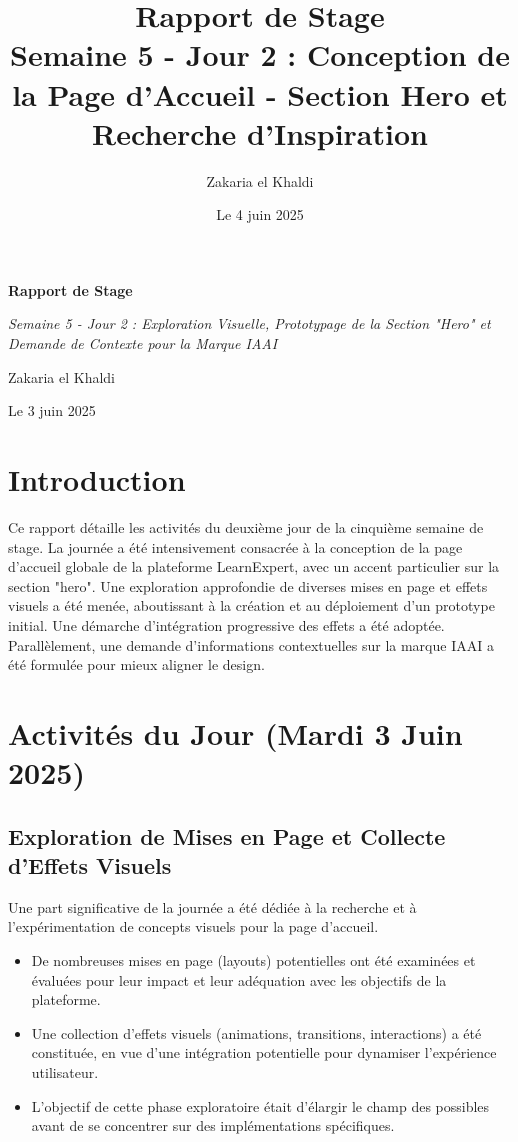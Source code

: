 \documentclass[12pt, a4paper]{article}
\title{\Huge\bfseries\color{primary} Rapport de Stage \\ 
      \Large Semaine 5 - Jour 2 : Conception de la Page d'Accueil - Section Hero et Recherche d'Inspiration} %
\author{\Large Zakaria el Khaldi}
\date{\large Le 4 juin 2025} %
\begin{document}
\begin{titlepage}
  \centering
  {\Huge\bfseries\color{primary} Rapport de Stage \par}
  \vspace{1cm}
  {\Large\itshape Semaine 5 - Jour 2 : Exploration Visuelle, Prototypage de la Section "Hero" et Demande de Contexte pour la Marque IAAI\par} %
  \vspace{2cm}
  
  \vspace{2cm}
  {\Large Zakaria el Khaldi\par}
  \vfill
  {\large Le 3 juin 2025\par} %
\end{titlepage}

\tableofcontents
\thispagestyle{empty}
\newpage

\section{Introduction}
\thispagestyle{fancy}
Ce rapport détaille les activités du deuxième jour de la cinquième semaine de stage. La journée a été intensivement consacrée à la conception de la page d'accueil globale de la plateforme LearnExpert, avec un accent particulier sur la section "hero". Une exploration approfondie de diverses mises en page et effets visuels a été menée, aboutissant à la création et au déploiement d'un prototype initial. Une démarche d'intégration progressive des effets a été adoptée. Parallèlement, une demande d'informations contextuelles sur la marque IAAI a été formulée pour mieux aligner le design.

\section{Activités du Jour (Mardi 3 Juin 2025)} %

\subsection{Exploration de Mises en Page et Collecte d'Effets Visuels}
Une part significative de la journée a été dédiée à la recherche et à l'expérimentation de concepts visuels pour la page d'accueil.
\begin{itemize}
    \item De nombreuses mises en page (layouts) potentielles ont été examinées et évaluées pour leur impact et leur adéquation avec les objectifs de la plateforme.
    \item Une collection d'effets visuels (animations, transitions, interactions) a été constituée, en vue d'une intégration potentielle pour dynamiser l'expérience utilisateur.
    \item L'objectif de cette phase exploratoire était d'élargir le champ des possibles avant de se concentrer sur des implémentations spécifiques.
\end{itemize}
\end{document}
